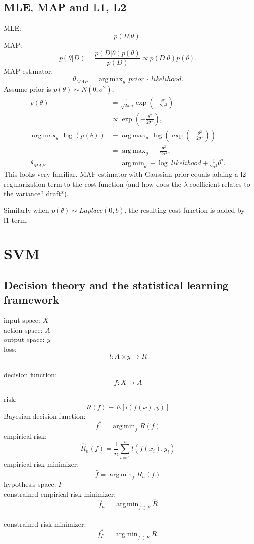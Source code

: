 \documentclass{report}
\DeclareMathOperator*{\argmax}{arg\,max}
\DeclareMathOperator*{\argmin}{arg\,min}
\begin{document}
\section{MLE, MAP and L1, L2}
MLE: \[
	p(D|\theta)
.\] 
MAP:
\[
	p(\theta|D) = \frac{p(D|\theta)p(\theta)}{p(D)} \propto p(D|\theta)p(\theta)
.\] 
MAP estimator: \[
	\theta_{MAP} = \argmax_{\theta}\ prior\ \cdot\ likelihood
.\] 
Assume prior is $p(\theta) \sim N(0, \sigma^2)$,
\begin{align*}
	p(\theta) &= \frac{1}{\sqrt{2\pi} \sigma} \exp \left( -\frac{\theta^2}{2\sigma^2} \right) \\
		  &\propto \exp \left( -\frac{
		  \theta^2}{2\sigma^2} \right), \\
		  \argmax_{\theta}\ \log(p(\theta)) &= \argmax_{\theta}\ \log \left( \exp \left( -\frac{\theta^2}{2\sigma^2} \right) \right) \\ 
 &= \argmax_{\theta}\ -\frac{\theta^2}{2\sigma^2}, \\
		  \theta_{MAP} &= \argmin_{\theta} - \log \ likelihood +  \frac{1}{2\sigma^2} \theta^2
.\end{align*}
This looks very familiar. MAP estimator with Gaussian prior equals adding a l2 regularization term to the cost function (and how does the $\lambda$ coefficient relates to the variance? draft*).

Similarly when $p(\theta) \sim Laplace(0, b)$, the resulting cost function is added by l1 term.
\chapter{SVM}
\section{Decision theory and the statistical learning framework}
input space: $X$\\
action space: $A$\\
output space: $y$\\
loss: \[ l: A \times y \to R\]\\
decision function: \[ f: X \to A\] \\
risk: \[R(f) = E[l(f(x), y)] \]
Bayesian decision function: \[ f^{\ast} = \argmin_{f} R(f) \]
empirical risk: \[
\hat{R}_n(f) = \frac{1}{n} \sum_{i=1}^{n} l(f(x_i), y_i)\]
empirical risk minimizer: \[
	\hat{f} = \argmin_{f} \hat{R}_n(f)
\] 
hypothesis space: $F$ \\
constrained empirical risk minimizer: \[
	\hat{f}_{n} = \argmin_{f \in F} \hat{R}
\] \\
constrained risk minimizer: \[
	f^{\ast}_{F} = \argmin_{f \in F} R
.\] 
\end{document}
